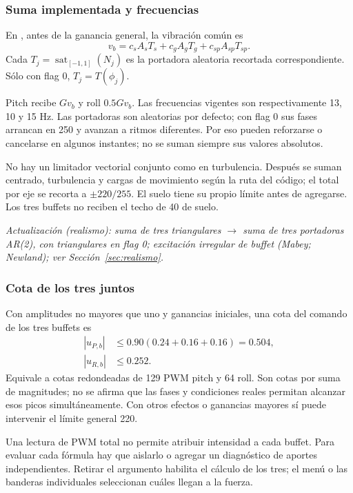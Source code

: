 \documentclass[11pt,a4paper]{article}
\newcommand{\code}[1]{\texttt{\detokenize{#1}}}
\newcommand{\sat}{\operatorname{sat}}
\begin{document}
\subsubsection{Suma implementada y frecuencias}
En \code{SimEffects.h}, antes de la ganancia general, la vibración común es
\begin{equation}
v_b=c_sA_sT_s+c_gA_gT_g+c_{sp}A_{sp}T_{sp}.
\end{equation}
Cada $T_j=\sat_{[-1,1]}(N_j)$ es la portadora aleatoria recortada correspondiente. Sólo con flag 0, $T_j=T(\phi_j)$.

Pitch recibe $Gv_b$ y roll $0.5Gv_b$. Las frecuencias vigentes son respectivamente 13, 10 y 15 Hz. Las portadoras son aleatorias por defecto; con flag 0 sus fases arrancan en 250 y avanzan a ritmos diferentes. Por eso pueden reforzarse o cancelarse en algunos instantes; no se suman siempre sus valores absolutos.

No hay un limitador vectorial conjunto como en turbulencia. Después se suman centrado, turbulencia y cargas de movimiento según la ruta del código; el total por eje se recorta a $\pm220/255$. El suelo tiene su propio límite antes de agregarse. Los tres buffets no reciben el techo de 40 de suelo.

\textit{Actualización (realismo): suma de tres triangulares $\rightarrow$ suma de tres portadoras AR(2), con triangulares en flag 0; excitación irregular de buffet (Mabey; Newland); ver Sección~\ref{sec:realismo}.}

\subsubsection{Cota de los tres juntos}
Con amplitudes no mayores que uno y ganancias iniciales, una cota del comando de los tres buffets es
\begin{align}
|u_{P,b}|&\le0.90(0.24+0.16+0.16)=0.504,\\
|u_{R,b}|&\le0.252.
\end{align}
Equivale a cotas redondeadas de 129 PWM pitch y 64 roll. Son cotas por suma de magnitudes; no se afirma que las fases y condiciones reales permitan alcanzar esos picos simultáneamente. Con otros efectos o ganancias mayores sí puede intervenir el límite general 220.

Una lectura de PWM total no permite atribuir intensidad a cada buffet. Para evaluar cada fórmula hay que aislarlo o agregar un diagnóstico de aportes independientes. Retirar el argumento \code{--no-buffets} habilita el cálculo de los tres; el menú o las banderas individuales seleccionan cuáles llegan a la fuerza.
\end{document}

